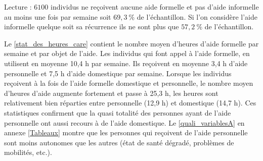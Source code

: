 \begin{Article}
\begin{refsection}[Bonnal]
\begin{table}[t]
\begin{threeparttable}[t]
\begin{tabularx}{\linewidth}{@{}X rrl@{}}
\end{tabularx}
\begin{tablenotes} \footnotesize
\item Lecture : $6100$ individus ne reçoivent aucune aide formelle et pas d'aide informelle au moins une fois par semaine soit $69,3~\%$ de l'échantillon. Si l'on considère l'aide informelle quelque soit sa récurrence ils ne sont plus que $57,2~\%$ de l'échantillon.
\end{tablenotes}
\end{threeparttable}
\end{table}

Le \autoref{stat_des_heures_care} contient le nombre moyen d'heures d'aide formelle par semaine et par objet de l'aide. Les individus qui font appel à l'aide formelle, en utilisent en moyenne 10,4 h par semaine. Ils reçoivent en moyenne 3,4 h d'aide personnelle et 7,5 h d'aide domestique par semaine. Lorsque les individus reçoivent à la fois de l'aide formelle domestique et personnelle, le nombre moyen d'heures d'aide augmente fortement et passe à 25,3 h, les heures sont relativement bien réparties entre personnelle (12,9 h) et domestique (14,7 h). Ces statistiques confirment que la quasi totalité des personnes ayant de l'aide personnelle ont aussi recours à de l'aide domestique. Le \autoref{quali_variablesA} en annexe \ref{Tableaux} montre que les personnes qui reçoivent de l'aide personnelle sont moins autonomes que les autres (état de santé dégradé, problèmes de mobilités, etc.).


\end{refsection}
\end{Article}
